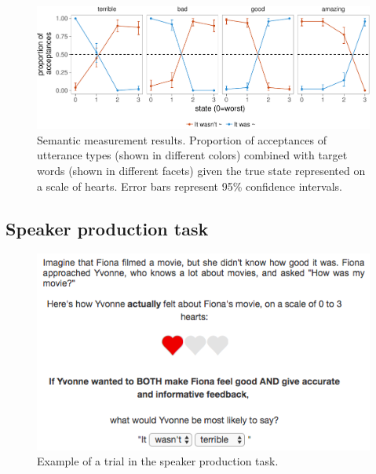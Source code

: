 \documentclass[floatsintext,man]{apa6}
\theoremstyle{definition}
\theoremstyle{definition}
\theoremstyle{definition}
\theoremstyle{remark}
\begin{document}
\begin{figure}[!h]
\includegraphics[width=\textwidth]{polite_NHB_wo_supp_files/figure-latex/litsem-1} \caption{Semantic measurement results. Proportion of acceptances of utterance types (shown in different colors) combined with target words (shown in different facets) given the true state represented on a scale of hearts. Error bars represent 95\% confidence intervals.}\label{fig:litsem}
\end{figure}

\subsection{Speaker production task}\label{speaker-production-task}

\begin{figure}[!h]
\includegraphics[width=\textwidth]{fig/screenshot} \caption{Example of a trial in the speaker production task.}\label{fig:screenshot}
\end{figure}
\end{document}
